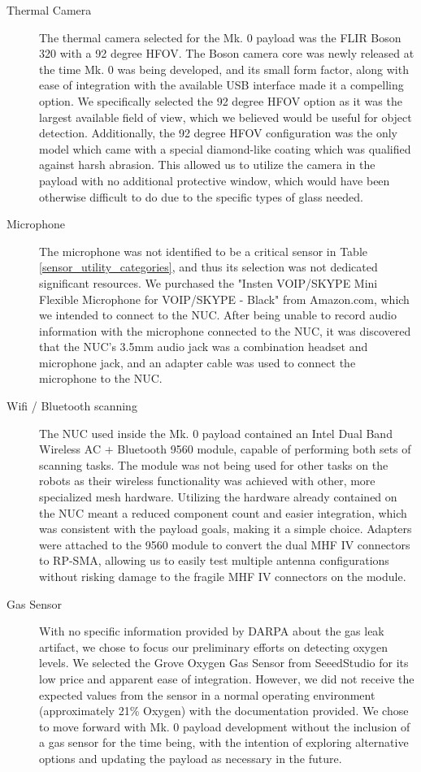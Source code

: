 \begin{description}
	\item[Thermal Camera] The thermal camera selected for the Mk. 0 payload was the FLIR Boson 320 with a 92 degree HFOV. The Boson camera core was newly released at the time Mk. 0 was being developed, and its small form factor, along with ease of integration with the available USB interface made it a compelling option. We specifically selected the 92 degree HFOV option as it was the largest available field of view, which we believed would be useful for object detection. Additionally, the 92 degree HFOV configuration was the only model which came with a special diamond-like coating which was qualified against harsh abrasion. This allowed us to utilize the camera in the payload with no additional protective window, which would have been otherwise difficult to do due to the specific types of glass needed.
	
	\item[Microphone] The microphone was not identified to be a critical sensor in Table \ref{sensor_utility_categories}, and thus its selection was not dedicated significant resources. We purchased the "Insten VOIP/SKYPE Mini Flexible Microphone for VOIP/SKYPE - Black" from Amazon.com, which we intended to connect to the NUC. After being unable to record audio information with the microphone connected to the NUC, it was discovered that the NUC's 3.5mm audio jack was a combination headset and microphone jack, and an adapter cable was used to connect the microphone to the NUC.

	\item[Wifi / Bluetooth scanning] The NUC used inside the Mk. 0 payload contained an Intel Dual Band Wireless AC + Bluetooth 9560 module, capable of performing both sets of scanning tasks. The module was not being used for other tasks on the robots as their wireless functionality was achieved with other, more specialized mesh hardware. Utilizing the hardware already contained on the NUC meant a reduced component count and easier integration, which was consistent with the payload goals, making it a simple choice. Adapters were attached to the 9560 module to convert the dual MHF IV connectors to RP-SMA, allowing us to easily test multiple antenna configurations without risking damage to the fragile MHF IV connectors on the module.

	\item[Gas Sensor] With no specific information provided by DARPA about the gas leak artifact, we chose to focus our preliminary efforts on detecting oxygen levels. We selected the Grove Oxygen Gas Sensor from SeeedStudio for its low price and apparent ease of integration. However, we did not receive the expected values from the sensor in a normal operating environment (approximately 21\% Oxygen) with the documentation provided. We chose to move forward with Mk. 0 payload development without the inclusion of a gas sensor for the time being, with the intention of exploring alternative options and updating the payload as necessary in the future.
		
\end{description}


